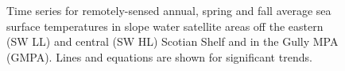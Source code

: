\documentclass[12pt]{article}\usepackage[]{graphicx}\usepackage[]{color}
\begin{document}
\begin{figure}[htb]

{\centering {} 

}

\caption{Time series for remotely-sensed annual, spring and fall average sea surface temperatures in slope water satellite areas off the eastern (SW LL) and central (SW HL) Scotian Shelf and in the Gully MPA (GMPA). Lines and equations are shown for significant trends.}\label{fig:figure15}
\end{figure}
\clearpage
\end{document}
